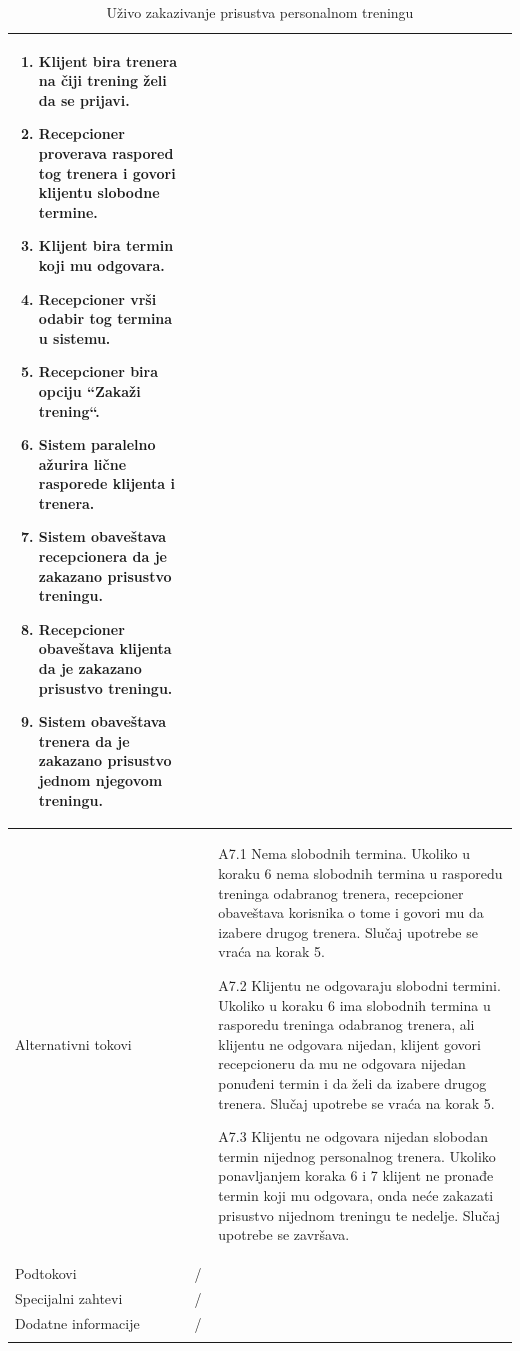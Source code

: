 \begin{longtable}{| p{} | p{} |}
\begin{enumerate}
    \item Klijent bira trenera na čiji trening želi da se prijavi.
    \item Recepcioner proverava raspored tog trenera i govori klijentu slobodne termine.
    \item Klijent bira termin koji mu odgovara.
    \item Recepcioner vrši odabir tog termina u sistemu.
    \item Recepcioner bira opciju ``Zakaži trening``.
    \item Sistem paralelno ažurira lične rasporede klijenta i trenera.
    \item Sistem obaveštava recepcionera da je zakazano prisustvo treningu.
    \item Recepcioner obaveštava klijenta da je zakazano prisustvo treningu.
    \item Sistem obaveštava trenera da je zakazano prisustvo jednom njegovom treningu.
   \end{enumerate}\\
\hline
    Alternativni tokovi & 
    \begin{itemize}
    \item[A7.1] Nema slobodnih termina. Ukoliko u koraku 6 nema slobodnih termina u rasporedu treninga odabranog trenera, recepcioner obaveštava korisnika o tome i govori mu da izabere drugog trenera. Slučaj upotrebe se vraća na korak 5.
    \item[A7.2] Klijentu ne odgovaraju slobodni termini. Ukoliko u koraku 6 ima slobodnih termina u rasporedu treninga odabranog trenera, ali klijentu ne odgovara nijedan, klijent govori recepcioneru da mu ne odgovara nijedan ponuđeni termin i da želi da izabere drugog trenera. Slučaj upotrebe se vraća na korak 5.
    \item[A7.3] Klijentu ne odgovara nijedan slobodan termin nijednog personalnog trenera. Ukoliko ponavljanjem koraka 6 i 7 klijent ne pronađe termin koji mu odgovara, onda neće zakazati prisustvo nijednom treningu te nedelje. Slučaj upotrebe se završava.
   \end{itemize}\\
\hline
    Podtokovi & /\\
\hline
    Specijalni zahtevi & /\\
\hline
    Dodatne informacije & /\\
\hline
\caption{Uživo zakazivanje prisustva personalnom treningu}
\end{longtable}

